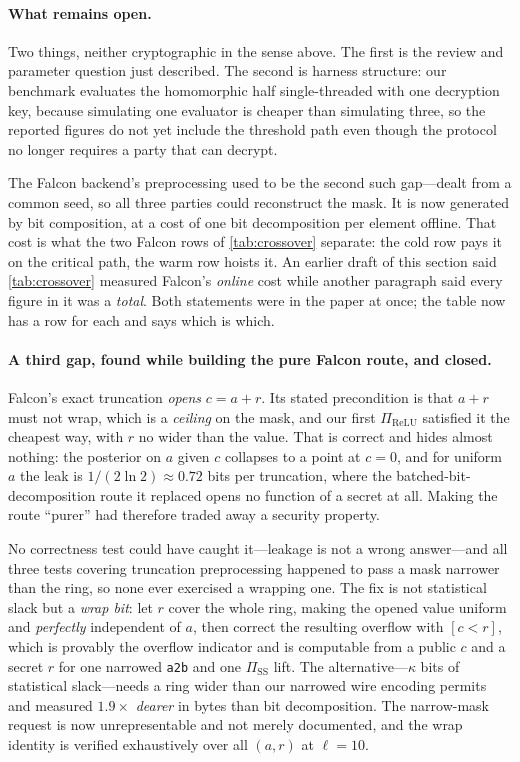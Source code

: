 \documentclass[11pt]{article}
\newcommand{\bt}[1]{\texttt{#1}}
\begin{document}
\paragraph{What remains open.} Two things, neither cryptographic in the sense above. The first is
the review and parameter question just described. The second is harness structure: our benchmark
evaluates the homomorphic half single-threaded with one decryption key, because simulating one
evaluator is cheaper than simulating three, so the reported figures do not yet include the
threshold path even though the protocol no longer requires a party that can decrypt.

The Falcon backend's preprocessing used to be the second such gap---dealt from a
common seed, so all three parties could reconstruct the mask. It is now generated
by bit composition, at a cost of one bit decomposition per element offline. That cost is
what the two Falcon rows of \cref{tab:crossover} separate: the cold row pays it on the
critical path, the warm row hoists it. An earlier draft of this section said
\cref{tab:crossover} measured Falcon's \emph{online} cost while another paragraph said every
figure in it was a \emph{total}. Both statements were in the paper at once; the table now has
a row for each and says which is which.

\paragraph{A third gap, found while building the pure Falcon route, and closed.}
\label{sec:disclosure}
Falcon's exact truncation \emph{opens} $c = a + r$. Its stated precondition is that
$a+r$ must not wrap, which is a \emph{ceiling} on the mask, and our first
$\Pi_{\mathrm{ReLU}}$ satisfied it the cheapest way, with $r$ no wider than the value.
That is correct and hides almost nothing: the posterior on $a$ given $c$ collapses to a
point at $c=0$, and for uniform $a$ the leak is $1/(2\ln 2) \approx 0.72$ bits per
truncation, where the batched-bit-decomposition route it replaced opens no function of a
secret at all. Making the route ``purer'' had therefore traded away a security property.

No correctness test could have caught it---leakage is not a wrong answer---and all three
tests covering truncation preprocessing happened to pass a mask narrower than the ring, so
none ever exercised a wrapping one. The fix is not statistical slack but a \emph{wrap bit}:
let $r$ cover the whole ring, making the opened value uniform and \emph{perfectly}
independent of $a$, then correct the resulting overflow with $[c < r]$, which is provably
the overflow indicator and is computable from a public $c$ and a secret $r$ for one
narrowed \bt{a2b} and one $\Pi_{\mathrm{SS}}$ lift. The alternative---$\kappa$ bits of
statistical slack---needs a ring wider than our narrowed wire encoding permits and measured
$1.9\times$ \emph{dearer} in bytes than bit decomposition. The narrow-mask request is now unrepresentable and not merely documented, and the wrap identity is verified
exhaustively over all $(a,r)$ at $\ell = 10$.
\end{document}
